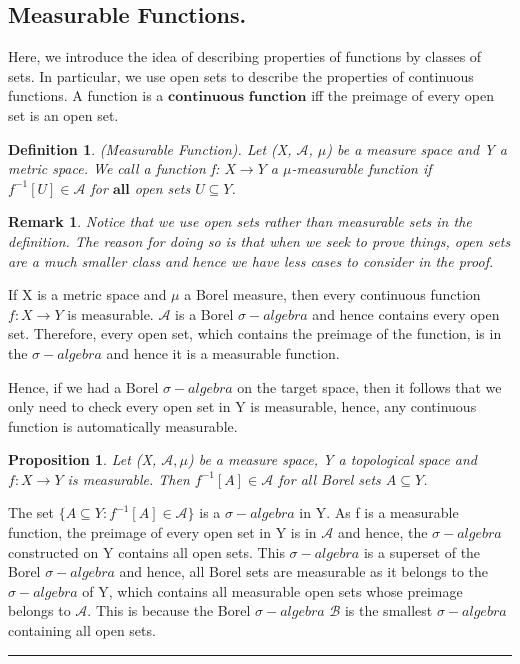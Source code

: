 \documentclass[twoside]{article}
\newtheorem{proposition}[theorem]{Proposition}
\newtheorem{remark}[theorem]{Remark}
\newtheorem{definition}[theorem]{Definition}
\newenvironment{proof}{{\bf Proof:}}{\hfill\rule{2mm}{2mm}}
\newcommand{\sa}{\sigma-algebra}
\begin{document}
\subsection{Measurable Functions.}
Here, we introduce the idea of describing properties of functions by classes of sets. In particular, we use open sets to describe the properties of continuous functions. A function is a $\textbf{continuous function}$ iff the preimage of every open set is an open set.

\begin{definition}
(Measurable Function). Let (X, $\mathcal{A}$, $\mu$) be a measure space and Y a metric space. We call a function f: $X \rightarrow Y$ a $\mu$-measurable function if $f^{-1}[U] \in \mathcal{A}$ for $\textbf{all}$ open sets $U \subseteq Y$.
\end{definition}

\begin{remark}
Notice that we use open sets rather than measurable sets in the definition. The reason for doing so is that when we seek to prove things, open sets are a much smaller class and hence we have less cases to consider in the proof. 
\end{remark}


If X is a metric space and $\mu$ a Borel measure, then every continuous function $f: X \rightarrow Y$ is measurable. $\mathcal{A}$ is a Borel $\sa$ and hence contains every open set. Therefore, every open set, which contains the preimage of the function, is in the $\sa$ and hence it is a measurable function.

Hence, if we had a Borel $\sa$ on the target space, then it follows that we only need to check every open set in Y is measurable, hence, any continuous function is automatically measurable. 


\begin{proposition}
Let (X, $\mathcal{A}, \mu$) be a measure space, Y a topological space and $f: X \rightarrow Y$ is measurable. Then $f^{-1}[A] \in \mathcal{A}$ for all Borel sets $A \subseteq Y$.
\end{proposition}

\begin{proof}
The set $\{A \subseteq Y: f^{-1}[A] \in \mathcal{A}\}$ is a $\sa$ in Y. As f is a measurable function, the preimage of every open set in Y is in $\mathcal{A}$ and hence, the $\sa$ constructed on Y contains all open sets. This $\sa$ is a superset of the Borel $\sa$ and hence, all Borel sets are measurable as it belongs to the $\sa$ of Y, which contains all measurable open sets whose preimage belongs to $\mathcal{A}$. This is because the Borel $\sa$ $\mathcal{B}$ is the smallest $\sa$ containing all open sets.
\end{proof}
\end{document}
